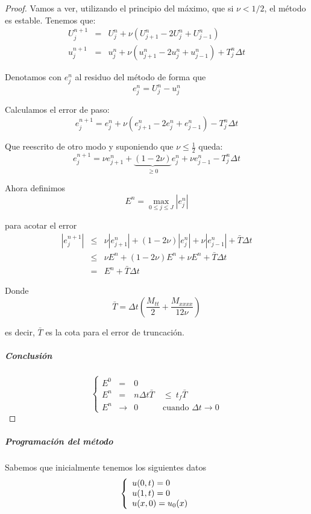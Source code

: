 \begin{proof}
	
Vamos a ver, utilizando el principio del máximo, que si $\nu < 1/2$, el método es estable. Tenemos que:
\begin{equation*}
\begin{array}{lll}
U_j^{n+1} &=& U_j^n + \nu (U_{j+1}^n-2U_j^n+U_{j-1}^n)\\
u_j^{n+1} &=& u_j^n + \nu (u_{j+1}^n-2u_j^n+u_{j-1}^n) + T_j^n \Delta t
\end{array}
\end{equation*}

Denotamos con $e_j^n$ al residuo del método de forma que
$$e_j^n = U_j^n - u_j^n$$

Calculamos el error de paso:
$$e_j^{n+1} = e_j^n + \nu (e_{j+1}^n-2e_j^n+e_{j-1}^n) - T_j^n \Delta t$$

Que reescrito de otro modo y suponiendo que $\nu \le \frac{1}{2}$ queda:
$$e_j^{n+1} = \nu e_{j+1}^n + \underbrace{(1-2\nu)}_{\ge 0} e_j^n + \nu e_{j-1}^n - T_j^n \Delta t$$

Ahora definimos
$$E^n = \max_{0\le j \le J} |e_j^n|$$

para acotar el error
\begin{equation*}
	\begin{array}{lll}
	|e_j^{n+1}| &\le& \nu|e_{j+1}^n| + (1-2\nu) |e_j^n| + \nu |e_{j-1}^n| +  \bar{T}\Delta t\\
	&\le& \nu E^n +(1-2\nu)E^n + \nu E^n + \bar{T}\Delta t\\
	&=& E^n + \bar{T} \Delta t
	\end{array}
\end{equation*}

Donde $$\bar{T} = \Delta t \left( \frac{M_{tt}}{2} + \frac{M_{xxxx}}{12\nu}  \right)$$

es decir, $\bar{T}$ es la cota para el error de truncación. 

\subparagraph*{Conclusión}
\begin{equation*}
	\left\{
	\begin{array}{llll}
	E^0 &=& 0&\\
	E^n &=& n\Delta t \bar{T}\ & \le\ t_f \bar{T}\\	
	E^n &\to& 0 &\text{cuando }\Delta t \to 0
	\end{array}
	\right.
\end{equation*}
\end{proof}

\subparagraph*{Programación del método}
Sabemos que inicialmente tenemos los siguientes datos
\begin{equation*}
	\left\{
	\begin{array}{l r}
		u(0,t) = 0\\
		u(1,t) = 0\\
		u(x,0) = u_0(x)
	\end{array}
	\right.
\end{equation*}

